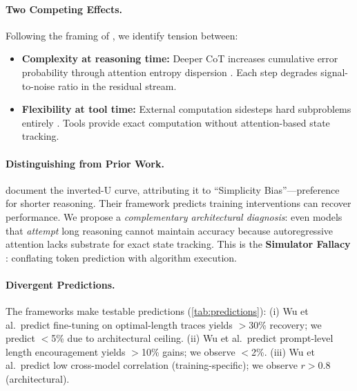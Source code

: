 \documentclass{article}
\theoremstyle{plain}
\theoremstyle{definition}
\theoremstyle{remark}
\begin{document}
\paragraph{Two Competing Effects.} Following the framing of \citet{kim2025masked}, we identify tension between:
\begin{itemize}[leftmargin=*,itemsep=1pt]
\item \textbf{Complexity at reasoning time:} Deeper CoT increases cumulative error probability through attention entropy dispersion \citep{gong2024attention,barbero2024oversquash}. Each step degrades signal-to-noise ratio in the residual stream.
\item \textbf{Flexibility at tool time:} External computation sidesteps hard subproblems entirely \citep{gao2023pal,gou2024tora,pan2024logiclm}. Tools provide exact computation without attention-based state tracking.
\end{itemize}

\paragraph{Distinguishing from Prior Work.} \citet{wu2025more} document the inverted-U curve, attributing it to ``Simplicity Bias''---preference for shorter reasoning. Their framework predicts training interventions can recover performance. We propose a \emph{complementary architectural diagnosis}: even models that \emph{attempt} long reasoning cannot maintain accuracy because autoregressive attention lacks substrate for exact state tracking. This is the \textbf{Simulator Fallacy} \citep{bender2020climbing}: conflating token prediction with algorithm execution.

\paragraph{Divergent Predictions.} The frameworks make testable predictions (\cref{tab:predictions}): (i) Wu et al.\ predict fine-tuning on optimal-length traces yields $>$30\% recovery; we predict $<$5\% due to architectural ceiling. (ii) Wu et al.\ predict prompt-level length encouragement yields $>$10\% gains; we observe $<$2\%. (iii) Wu et al.\ predict low cross-model correlation (training-specific); we observe $r>0.8$ (architectural).
\end{document}
